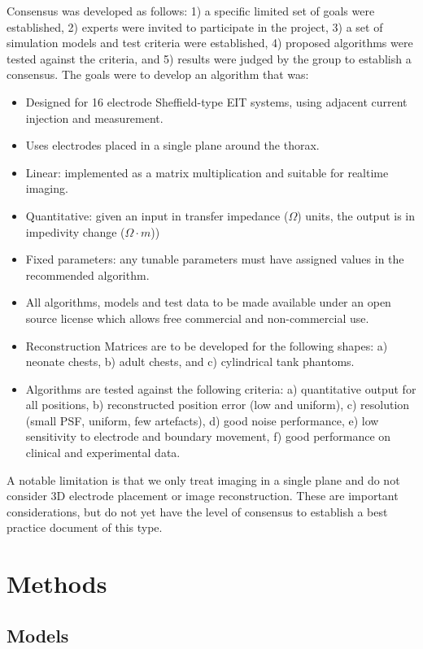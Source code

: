 \documentclass[12pt]{iopart}
\begin{document}
Consensus was developed as follows: 1) a specific limited
set of goals were established, 2) experts were invited
to participate in the project, 3) a set of simulation models
and test criteria were established, 4) proposed algorithms
were tested against the criteria, and 5) results were judged
by the group to establish a consensus.
The goals were to develop an algorithm that was:
\begin{itemize}
\item Designed for 16 electrode Sheffield-type EIT systems, using
      adjacent current injection and measurement.
\item Uses electrodes placed in a single plane around the thorax.
\item Linear: implemented as a matrix multiplication and suitable
              for realtime imaging.
\item Quantitative: given an input in transfer impedance ($\Omega$) units,
                    the output is in impedivity change ($\Omega\cdot m$))
\item Fixed parameters: any tunable parameters must have assigned
                    values in the recommended algorithm.
\item All algorithms, models and test data to be made available
                    under an open source license which allows
                    free commercial and non-commercial use.
\item Reconstruction Matrices are to be developed for the
      following shapes:
   a) neonate chests, 
   b) adult chests, and 
   c) cylindrical tank phantoms.
\item Algorithms are tested against the following criteria:
    a) quantitative output for all positions,
    b) reconstructed position error (low and uniform),
    c) resolution (small PSF, uniform, few artefacts),
    d) good noise performance,
    e) low sensitivity to electrode and boundary movement,
    f) good performance on clinical and experimental data.
\end{itemize}
A notable limitation is that we only treat imaging in
a single plane and do not consider 3D electrode placement or
image reconstruction. These are important considerations, but
do not yet have the level of consensus to establish a best
practice document of this type.

\section{Methods}
\subsection{Models}
\end{document}

